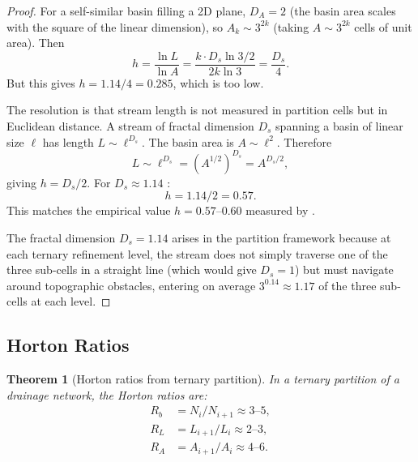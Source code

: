 \documentclass[10pt,twocolumn]{article}
\newtheorem{theorem}{Theorem}[section]
\theoremstyle{definition}
\theoremstyle{remark}
\begin{document}
\begin{proof}
For a self-similar basin filling a 2D plane,
$D_A=2$ (the basin area scales with the square of the linear
dimension), so $A_k\sim 3^{2k}$ (taking $A\sim 3^{2k}$
cells of unit area).  Then
\begin{equation}
  h = \frac{\ln L}{\ln A}
  = \frac{k\cdot D_s\ln 3/2}{2k\ln 3}
  = \frac{D_s}{4}.
\end{equation}
But this gives $h=1.14/4=0.285$, which is too low.

The resolution is that stream length is not measured in
partition cells but in Euclidean distance.  A stream of fractal
dimension $D_s$ spanning a basin of linear size $\ell$ has
length $L\sim\ell^{D_s}$.  The basin area is $A\sim\ell^2$.
Therefore
\begin{equation}
  L \sim \ell^{D_s} = (A^{1/2})^{D_s} = A^{D_s/2},
\end{equation}
giving $h = D_s/2$.  For $D_s\approx 1.14$
\citep{RodriguezIturbe1997}:
\begin{equation}
  h = 1.14/2 = 0.57.
\end{equation}
This matches the empirical value $h=0.57$--$0.60$ measured by
\citet{Hack1957}.

The fractal dimension $D_s=1.14$ arises in the partition
framework because at each ternary refinement level, the stream
does not simply traverse one of the three sub-cells in a
straight line (which would give $D_s=1$) but must navigate
around topographic obstacles, entering on average
$3^{0.14}\approx 1.17$ of the three sub-cells at each level.
\end{proof}

\subsection{Horton Ratios}\label{sec:horton}

\begin{theorem}[Horton ratios from ternary partition]
\label{thm:horton}
In a ternary partition of a drainage network, the Horton ratios
are:
\begin{align}
  R_b &= N_i/N_{i+1}\approx 3\text{--}5,\label{eq:Rb}\\
  R_L &= L_{i+1}/L_i \approx 2\text{--}3,\label{eq:RL}\\
  R_A &= A_{i+1}/A_i \approx 4\text{--}6.\label{eq:RA}
\end{align}
\end{theorem}
\end{document}
